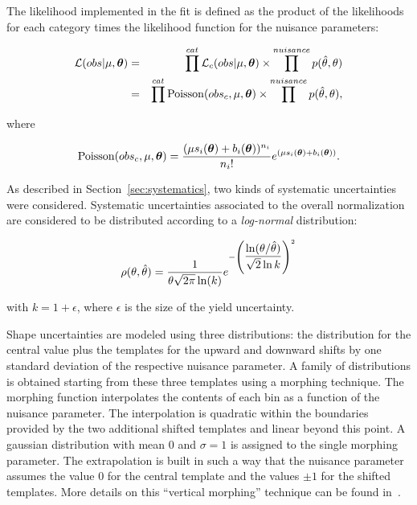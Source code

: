 The likelihood implemented in the fit is defined as the product of the likelihoods for each category times the likelihood function for the nuisance parameters:

\begin{eqnarray}
\mathcal{L}(obs|\mu, \boldsymbol\theta) &=& \prod^{cat} \mathcal{L}_c(obs|\mu, \boldsymbol\theta) \times \prod^{nuisance} p(\hat{\theta},\theta) \nonumber \\
&=& \prod^{cat} \operatorname{Poisson}(obs_c, \mu, \boldsymbol\theta) \times \prod^{nuisance} p(\hat{\theta},\theta),
\end{eqnarray}


where

\begin{equation}
\operatorname{Poisson}(obs_c, \mu, \boldsymbol\theta) = \dfrac{(\mu s_i(\boldsymbol\theta) + b_i(\boldsymbol\theta))^{n_i}}{n_i!}e^{(\mu s_i(\boldsymbol\theta) + b_i(\boldsymbol\theta))}.
\end{equation}

As described in Section~\ref{sec:systematics}, two kinds of systematic uncertainties were considered. Systematic uncertainties associated to the overall normalization are considered to be distributed according to a \emph{log-normal} distribution:

\begin{equation}
\rho(\theta, \hat{\theta}) = \dfrac{1}{\theta\sqrt{2\pi}\operatorname{ln}(k)} e^{-\left(\dfrac{\operatorname{ln}(\theta/\hat{\theta})}{\sqrt{2}\operatorname{ln}k}\right)^2}
\end{equation}

with $k = 1+ \epsilon$, where $\epsilon$ is the size of the yield uncertainty.

Shape uncertainties are modeled using three distributions: the distribution for the central value plus the templates for the upward and downward shifts by one standard deviation of the respective nuisance parameter. A family of distributions is obtained starting from these three templates using a morphing technique. The morphing function interpolates the contents of each bin as a function of the nuisance parameter. The interpolation is quadratic within the boundaries provided by the two additional shifted templates and linear beyond this point. A gaussian distribution with mean 0 and $\sigma = 1$ is assigned to the single morphing parameter. The extrapolation is built in such a way that the nuisance parameter assumes the value 0 for the central template and the values $\pm1$ for the shifted templates. More details on this ``vertical morphing'' technique can be found in~\cite{Conway:2011in}.

